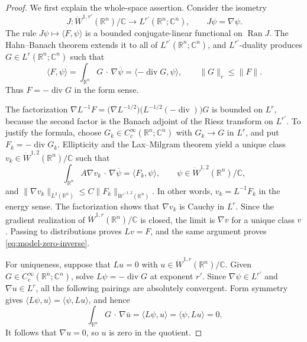 \documentclass[12pt]{amsart}
\newcommand{\cdo}{\, \cdot \,}
\newcommand{\diver}{\operatorname{div}}
\theoremstyle{remark}
\begin{document}
\begin{proof}
We first explain the whole-space assertion.  Consider the isometry
\[
 J:\dot W^{1,r'}(\mathbb R^n)/\mathbb C
   \longrightarrow L^{r'}(\mathbb R^n;\mathbb C^n),
 \qquad J\psi=\nabla\psi.
\]
The rule \(J\psi\mapsto\langle F,\psi\rangle\) is a bounded
conjugate-linear functional
on \(\operatorname{Ran}J\).  The Hahn--Banach theorem extends it to all of
\(L^{r'}(\mathbb R^n;\mathbb C^n)\), and \(L^{r'}\)-duality produces
\(G\in L^r(\mathbb R^n;\mathbb C^n)\) such that
\[
 \langle F,\psi\rangle
 =\int_{\mathbb R^n}G\mathbin{\cdo}\nabla\overline\psi
 =\langle-\diver G,\psi\rangle,
 \qquad \|G\|_r\leq\|F\|.
\]
Thus \(F=-\diver G\) in the form sense.

The factorization $\nabla L^{-1}F
 =\bigl(\nabla L^{-1/2}\bigr)
  \bigl(L^{-1/2}(-\diver)\bigr)G$ is bounded on \(L^r\), because the second factor is the Banach adjoint of
the Riesz transform on \(L^{r'}\).  To justify the formula, choose
\(G_k\in C_c^\infty(\mathbb R^n;\mathbb C^n)\) with
\(G_k\to G\) in \(L^r\), and put \(F_k=-\diver G_k\).  Ellipticity and the
Lax--Milgram theorem yield a unique class
\(v_k\in\dot W^{1,2}(\mathbb R^n)/\mathbb C\) such that
\[
 \int_{\mathbb R^n}A\nabla v_k\mathbin{\cdo}\nabla\overline\psi
 =\langle F_k,\psi\rangle,
 \qquad \psi\in\dot W^{1,2}(\mathbb R^n)/\mathbb C,
\]
and $\|\nabla v_k\|_{L^2(\mathbb R^n)}
 \leq C\|F_k\|_{\dot W^{-1,2}(\mathbb R^n)}$. In other words, \(v_k=L^{-1}F_k\) in the energy sense.  The factorization
shows that \(\nabla v_k\) is Cauchy in \(L^r\).  Since the gradient
realization of \(\dot W^{1,r}(\mathbb R^n)/\mathbb C\) is closed, the
limit is \(\nabla v\) for a unique class \(v\).  Passing to distributions
proves \(Lv=F\), and the same argument proves
\eqref{eq:model-zero-inverse}.

For uniqueness, suppose that \(Lu=0\) with
\(u\in\dot W^{1,r}(\mathbb R^n)/\mathbb C\).  Given
\(G\in C_c^\infty(\mathbb R^n;\mathbb C^n)\), solve
\(L\psi=-\diver G\) at exponent \(r'\).  Since
\(\nabla\psi\in L^{r'}\) and \(\nabla u\in L^r\), all the following
pairings are absolutely convergent.  Form symmetry gives
\(\langle L\psi,u\rangle=\langle\psi,Lu\rangle\), and hence
\[
 \int_{\mathbb R^n}G\mathbin{\cdo}\nabla\overline u
 =\langle L\psi,u\rangle
 =\langle\psi,Lu\rangle=0.
\]
It follows that \(\nabla u=0\), so \(u\) is zero in the quotient.


\end{proof}
\end{document}
